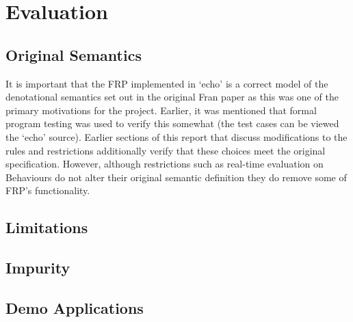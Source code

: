 \chapter{Evaluation}
  
  \section{Original Semantics}
    It is important that the FRP implemented in `echo' is a correct model of the denotational semantics
    set out in the original Fran paper \cite{Elliott1997} as this was one of the primary motivations for
    the project. Earlier, it was mentioned that formal program testing was used to verify
    this somewhat (the test cases can be viewed the `echo' source). Earlier sections of this report
    that discuss modifications to the rules and restrictions additionally verify that these choices meet the original 
    specification. However, although restrictions such as real-time evaluation on Behaviours do not
    alter their original semantic definition they do remove some of FRP's functionality.
    
  \section{Limitations}
  
  \section{Impurity}
  
  \section{Demo Applications}
